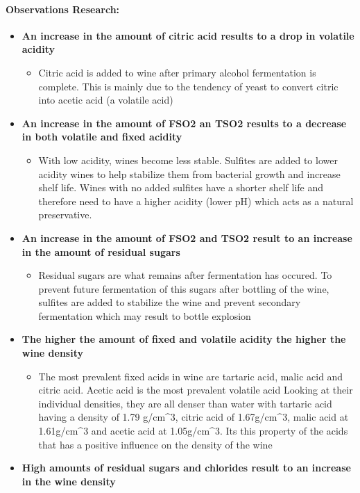 \documentclass[11pt]{article}
\providecommand{\tightlist}{%
      \setlength{\itemsep}{0pt}\setlength{\parskip}{0pt}}
\begin{document}
    \paragraph{Observations Research:}\label{observations-research}

\begin{itemize}
\item
  \textbf{An increase in the amount of citric acid results to a drop in
  volatile acidity}

  \begin{itemize}
  \tightlist
  \item
    Citric acid is added to wine after primary alcohol fermentation is
    complete. This is mainly due to the tendency of yeast to convert
    citric into acetic acid (a volatile acid)
  \end{itemize}
\item
  \textbf{An increase in the amount of FSO2 an TSO2 results to a
  decrease in both volatile and fixed acidity}

  \begin{itemize}
  \tightlist
  \item
    With low acidity, wines become less stable. Sulfites are added to
    lower acidity wines to help stabilize them from bacterial growth and
    increase shelf life. Wines with no added sulfites have a shorter
    shelf life and therefore need to have a higher acidity (lower pH)
    which acts as a natural preservative.
  \end{itemize}
\item
  \textbf{An increase in the amount of FSO2 and TSO2 result to an
  increase in the amount of residual sugars}

  \begin{itemize}
  \tightlist
  \item
    Residual sugars are what remains after fermentation has occured. To
    prevent future fermentation of this sugars after bottling of the
    wine, sulfites are added to stabilize the wine and prevent secondary
    fermentation which may result to bottle explosion
  \end{itemize}
\item
  \textbf{The higher the amount of fixed and volatile acidity the higher
  the wine density}

  \begin{itemize}
  \tightlist
  \item
    The most prevalent fixed acids in wine are tartaric acid, malic acid
    and citric acid. Acetic acid is the most prevalent volatile acid
    Looking at their individual densities, they are all denser than
    water with tartaric acid having a density of 1.79 g/cm\^{}3, citric
    acid of 1.67g/cm\^{}3, malic acid at 1.61g/cm\^{}3 and acetic acid
    at 1.05g/cm\^{}3. Its this property of the acids that has a positive
    influence on the density of the wine
  \end{itemize}
\item
  \textbf{High amounts of residual sugars and chlorides result to an
  increase in the wine density}


\end{itemize}
\end{document}
